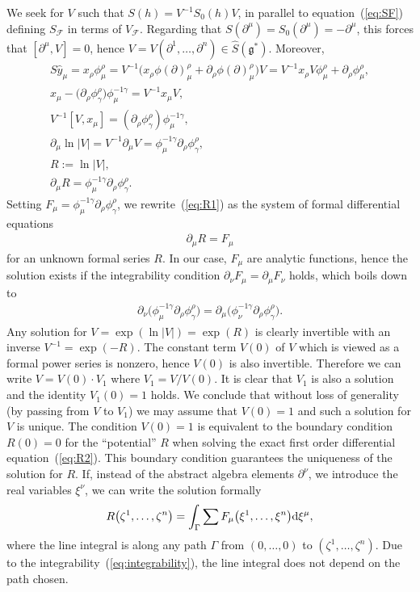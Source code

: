 \documentclass[pdftex]{sigma}
\def\gg{\mathfrak{g}}
\numberwithin{equation}{section}
\begin{document}
We seek for $V$ such that $S(h) = V^{-1}S_0(h)V$, in parallel to equation~(\ref{eq:SF}) defining $S_{\mathcal{F}}$ in terms of $V_{\mathcal{F}}$. Regarding that $S(\partial^\mu) = S_0(\partial^\mu)= -\partial^\mu$, this forces that $[\partial^\mu,V] = 0$, hence $V = V(\partial^1,\dots,\partial^n)\in\hat{S}(\gg^*)$. Moreover,
\begin{gather}
S \hat{y}_\mu = x_\rho\phi^\rho_\mu = V^{-1}\big(x_\rho\phi(\partial)^\rho_\mu + \partial_\rho\phi(\partial)^\rho_\mu\big)V = V^{-1}x_\rho V\phi^\rho_\mu + \partial_\rho\phi^\rho_\mu,\nonumber\\
x_\mu - \big(\partial_\rho \phi^\rho_\gamma\big)\phi^{-1\gamma}_\mu = V^{-1} x_\mu V,\nonumber\\
V^{-1} [V,x_\mu] = (\partial_\rho\phi^\rho_\gamma)\phi^{-1\gamma}_\mu,\nonumber\\
\partial_\mu{\ln|V|} = V^{-1}\partial_\mu V = \phi^{-1\gamma}_\mu\partial_\rho\phi^\rho_\gamma,\nonumber\\
R := \ln|V|,\nonumber\\
\partial_\mu R = \phi^{-1\gamma}_\mu\partial_\rho\phi^\rho_\gamma.\label{eq:R1}
\end{gather}
Setting $F_\mu = \phi^{-1\gamma}_\mu\partial_\rho\phi^\rho_\gamma$, we rewrite~(\ref{eq:R1}) as the system of formal differential equations
\begin{gather}\label{eq:R2}
\partial_\mu R = F_\mu
\end{gather}
for an unknown formal series $R$. In our case, $F_\mu$ are analytic functions, hence the solution exists if the integrability condition $\partial_\nu F_\mu= \partial_\mu F_\nu$ holds, which boils down to
\begin{gather}\label{eq:integrability}
\partial_\nu\big(\phi^{-1\gamma}_\mu\partial_\rho\phi^\rho_\gamma\big) = \partial_\mu\big(\phi^{-1\gamma}_\nu\partial_\rho\phi^\rho_\gamma\big).
\end{gather}
Any solution for $V = \exp(\ln|V|) = \exp(R)$ is clearly invertible with an inverse $V^{-1} = \exp(-R)$. The constant term $V(0)$ of $V$ which is viewed as a formal power series is nonzero, hence $V(0)$ is also invertible. Therefore we can write $V = V(0)\cdot V_1$ where $V_1 = V/V(0)$. It is clear that $V_1$ is also a solution and the identity $V_1(0) = 1$ holds. We conclude that without loss of generality (by passing from $V$ to $V_1$) we may assume that $V(0) = 1$ and such a solution for $V$ is unique. The condition $V(0)=1$ is equivalent to the boundary condition $R(0) = 0$ for the ``potential'' $R$ when solving the exact first order differential equation~(\ref{eq:R2}). This boundary condition guarantees the uniqueness of the solution for $R$. If, instead of the abstract algebra elements $\partial^\nu$, we introduce the real variables $\xi^\nu$, we can write the solution formally
\begin{gather*}
R\big(\zeta^1,\dots,\zeta^n\big) = \int_\Gamma \sum F_\mu\big(\xi^1,\dots,\xi^n\big) {\rm d} \xi^\mu,
\end{gather*}
where the line integral is along any path $\Gamma$ from $(0,\dots,0)$ to $(\zeta^1,\dots,\zeta^n)$. Due to the integrability~(\ref{eq:integrability}), the line integral does not depend on the path chosen.
\end{document}
